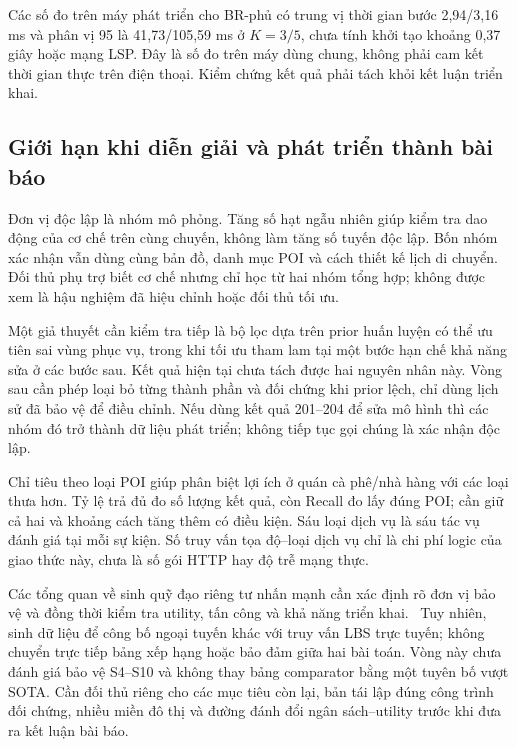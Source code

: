 Các số đo trên máy phát triển cho BR-phủ có trung vị thời gian bước 2,94/3,16 ms và phân vị 95 là 41,73/105,59 ms ở $K=3/5$, chưa tính khởi tạo khoảng 0,37 giây hoặc mạng LSP. Đây là số đo trên máy dùng chung, không phải cam kết thời gian thực trên điện thoại. Kiểm chứng kết quả phải tách khỏi kết luận triển khai.

\subsection{Giới hạn khi diễn giải và phát triển thành bài báo}

Đơn vị độc lập là nhóm mô phỏng. Tăng số hạt ngẫu nhiên giúp kiểm tra dao động của cơ chế trên cùng chuyến, không làm tăng số tuyến độc lập. Bốn nhóm xác nhận vẫn dùng cùng bản đồ, danh mục POI và cách thiết kế lịch di chuyển. Đối thủ phụ trợ biết cơ chế nhưng chỉ học từ hai nhóm tổng hợp; không được xem là hậu nghiệm đã hiệu chỉnh hoặc đối thủ tối ưu.

Một giả thuyết cần kiểm tra tiếp là bộ lọc dựa trên prior huấn luyện có thể ưu tiên sai vùng phục vụ, trong khi tối ưu tham lam tại một bước hạn chế khả năng sửa ở các bước sau. Kết quả hiện tại chưa tách được hai nguyên nhân này. Vòng sau cần phép loại bỏ từng thành phần và đối chứng khi prior lệch, chỉ dùng lịch sử đã bảo vệ để điều chỉnh. Nếu dùng kết quả 201--204 để sửa mô hình thì các nhóm đó trở thành dữ liệu phát triển; không tiếp tục gọi chúng là xác nhận độc lập.

Chỉ tiêu theo loại POI giúp phân biệt lợi ích ở quán cà phê/nhà hàng với các loại thưa hơn. Tỷ lệ trả đủ đo số lượng kết quả, còn Recall đo lấy đúng POI; cần giữ cả hai và khoảng cách tăng thêm có điều kiện. Sáu loại dịch vụ là sáu tác vụ đánh giá tại mỗi sự kiện. Số truy vấn tọa độ--loại dịch vụ chỉ là chi phí logic của giao thức này, chưa là số gói HTTP hay độ trễ mạng thực.

Các tổng quan về sinh quỹ đạo riêng tư nhấn mạnh cần xác định rõ đơn vị bảo vệ và đồng thời kiểm tra utility, tấn công và khả năng triển khai.~\citep{buchholz2024sok} Tuy nhiên, sinh dữ liệu để công bố ngoại tuyến khác với truy vấn LBS trực tuyến; không chuyển trực tiếp bảng xếp hạng hoặc bảo đảm giữa hai bài toán. Vòng này chưa đánh giá bảo vệ S4--S10 và không thay bảng comparator bằng một tuyên bố vượt SOTA. Cần đối thủ riêng cho các mục tiêu còn lại, bản tái lập đúng công trình đối chứng, nhiều miền đô thị và đường đánh đổi ngân sách--utility trước khi đưa ra kết luận bài báo.
\par\endgroup
